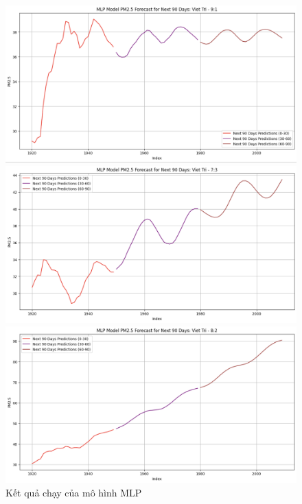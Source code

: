 \begin{figure}[H]
    \begin{minipage}{0.15\textwidth}
    \centering
    \includegraphics[width=1\textwidth]{img/final/MLP/90D/MLP_9_1_VT_90D.png}
    \end{minipage}
    \hfill
    \begin{minipage}{0.15\textwidth}
    \centering
    \includegraphics[width=1\textwidth]{img/final/MLP/90D/MLP_7_3_VT_90D.png}
    \end{minipage}
    \hfill
    \begin{minipage}{0.15\textwidth}
    \centering
    \includegraphics[width=1\textwidth]{img/final/MLP/90D/MLP_8_2_VT_90D.png}
    \end{minipage}
    \hfill
    
    \caption{Kết quả chạy của mô hình MLP}
    \label{fig:mlp}
\end{figure}
